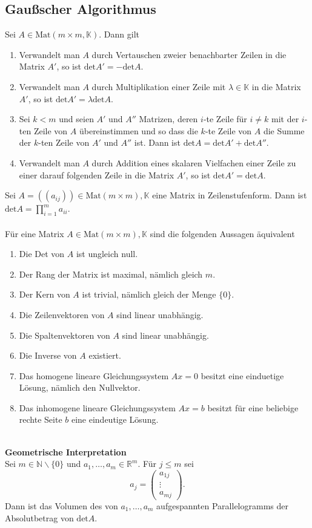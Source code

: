 \documentclass[a4paper,12pt]{article}
\begin{document}
\subsection{Gaußscher Algorithmus}
Sei $A \in \text{Mat}\left(m\times m,\mathbb{K}\right)$. Dann gilt
\begin{enumerate}[label=(\alph*)]
        \item Verwandelt man $A$ durch Vertauschen zweier benachbarter Zeilen in die Matrix $A'$, so ist $\text{det}A'=-\text{det}A$. 
        \item Verwandelt man $A$ durch Multiplikation einer Zeile mit $\lambda  \in \mathbb{K}$ in die Matrix $A'$, so ist $\text{det}A'=\lambda \text{det}A$.
        \item Sei $k<m$ und seien $A'$ und $A''$ Matrizen, deren $i$-te Zeile für $i \neq k$ mit der $i$-ten Zeile von $A$ übereinstimmen und so dass die $k$-te Zeile von $A$ die Summe der $k$-ten Zeile von $A'$ und $A''$ ist. Dann ist $\text{det}A=\text{det}A'+\text{det}A''$.
        \item Verwandelt man $A$ durch Addition eines skalaren Vielfachen einer Zeile zu einer darauf folgenden Zeile in die Matrix $A'$, so ist $\text{det}A'=\text{det}A$.
\end{enumerate}
Sei $A=\left(\left(a_{ij}\right)\right) \in \text{Mat}\left(m\times m\right),\mathbb{K}$ eine Matrix in Zeilenstufenform. Dann ist $\text{det}A=\prod_{i=1}^{m}a_{ii}$.\\\\
Für eine Matrix $A \in \text{Mat}\left(m\times m\right),\mathbb{K}$ sind die folgenden Aussagen äquivalent
\begin{enumerate}[label=(\alph*)]
        \item Die Det von $A$ ist ungleich null.
        \item Der Rang der Matrix ist maximal, nämlich gleich $m$.
        \item Der Kern von $A$ ist trivial, nämlich gleich der Menge $\{0\}$.
        \item Die Zeilenvektoren von $A$ sind linear unabhängig.
        \item Die Spaltenvektoren von $A$ sind linear unabhängig.
        \item Die Inverse von $A$ existiert.
        \item Das homogene lineare Gleichungssystem $Ax=0$ besitzt eine einduetige Lösung, nämlich den Nullvektor.
        \item Das inhomogene lineare Gleichungssystem $Ax=b$ besitzt für eine beliebige rechte Seite $b$ eine eindeutige Lösung.
\end{enumerate}
\hfill\\\textbf{Geometrische Interpretation}\\ 
Sei $m \in \mathbb{N}\backslash\{0\}$ und $a_1,\hdots ,a_m \in \mathbb{R}^m$. Für $j\leq m$ sei 
\[ 
        a_j=\left(\begin{matrix}
                a_{1j}\\\vdots \\a_{mj}
        \end{matrix}\right)
.\] 
Dann ist das Volumen des von $a_1,\hdots ,a_m$ aufgespannten Parallelogramms der Absolutbetrag von $\text{det}A$. 
\end{document}
